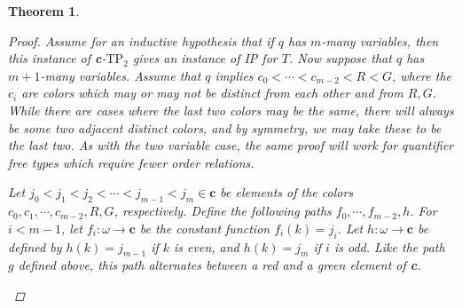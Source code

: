 \documentclass{article}
\newcommand{\TPii}{\text{TP}_2}
\newtheorem{theorem}{Theorem}
\theoremstyle{definition}
\theoremstyle{definition}
\theoremstyle{definition}
\theoremstyle{definition}
\begin{document}
\begin{theorem}
\begin{proof}
    Assume for an inductive hypothesis that if $q$ has $m$-many variables, then this instance of \textbf{c}-$\TPii$ gives an instance of IP for $T$. Now suppose that $q$ has $m+1$-many variables. Assume that $q$ implies $c_0<\dotsm <c_{m-2}<R<G$, where the $c_i$ are colors which may or may not be distinct from each other and from $R,G$. While there are cases where the last two colors may be the same, there will always be some two adjacent distinct colors, and by symmetry, we may take these to be the last two. As with the two variable case, the same proof will work for quantifier free types which require fewer order relations.

    Let $j_0<j_1<j_2<\dotsm <j_{m-1}<j_{m}\in \textbf{c}$ be elements of the colors $c_0,c_1,\dotsm, c_{m-2},R,G$, respectively. Define the following paths $f_0,\dotsm, f_{m-2},h$. For $i<m-1$, let $f_i\colon \omega\to \textbf{c}$ be the constant function $f_i(k)=j_i$. Let $h\colon \omega\to \textbf{c}$ be defined by $h(k)=j_{m-1}$  if $k$ is even, and $h(k)=j_{m}$ if $i$ is odd. Like the path $g$ defined above, this path alternates between a red and a green element of \textbf{c}.

\begin{center}
\end{center}
\end{proof}
\end{theorem}
\end{document}
